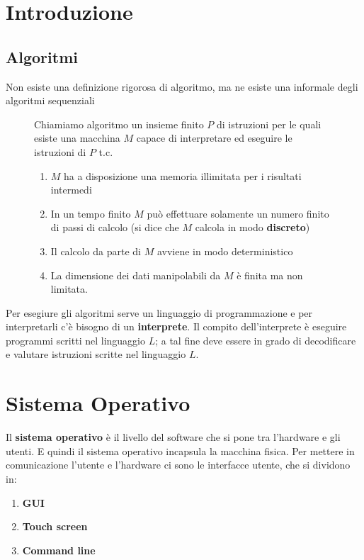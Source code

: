 \documentclass[a4paper]{article}
\begin{document}


\tableofcontents
\pagebreak

\section{Introduzione}

\subsection{Algoritmi}
Non esiste una definizione rigorosa di algoritmo, ma ne esiste una informale degli
algoritmi sequenziali
\begin{figure}[H]
  \begin{definition}
    Chiamiamo algoritmo un insieme finito \( P \) di istruzioni per le quali esiste
    una macchina \( M \) capace di interpretare ed eseguire le istruzioni di \( P \) t.c.
    \begin{enumerate}
      \item \( M \) ha a disposizione una memoria illimitata per i risultati intermedi

      \item In un tempo finito \( M \) può effettuare solamente un numero finito di
        passi di calcolo (si dice che \( M \) calcola in modo \textbf{discreto})
        
      \item Il calcolo da parte di \( M \) avviene in modo deterministico
        
      \item La dimensione dei dati manipolabili da \( M \) è finita ma non limitata.
    \end{enumerate}
  \end{definition}
\end{figure}

\noindent
Per esegiure gli algoritmi serve un linguaggio di programmazione e per interpretarli
c'è bisogno di un \textbf{interprete}. Il compito dell'interprete è eseguire programmi
scritti nel linguaggio \( L \); a tal fine deve essere in grado di decodificare
e valutare istruzioni scritte nel linguaggio \( L \).

\section{Sistema Operativo}
Il \textbf{sistema operativo} è il livello del software che si pone tra l'hardware
e gli utenti. E quindi il sistema operativo incapsula la macchina fisica.
Per mettere in comunicazione l'utente e l'hardware ci sono le interfacce utente,
che si dividono in:
\begin{enumerate}
  \item \textbf{GUI}
  \item \textbf{Touch screen}
  \item \textbf{Command line}
\end{enumerate}
\end{document}
